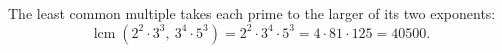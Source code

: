The least common multiple takes each prime to the larger of its two exponents:
\[
\operatorname{lcm}\left(2^2\cdot3^3,\ 3^4\cdot5^3\right)=2^2\cdot3^4\cdot5^3=4\cdot81\cdot125=\boxed{40500}.
\]
